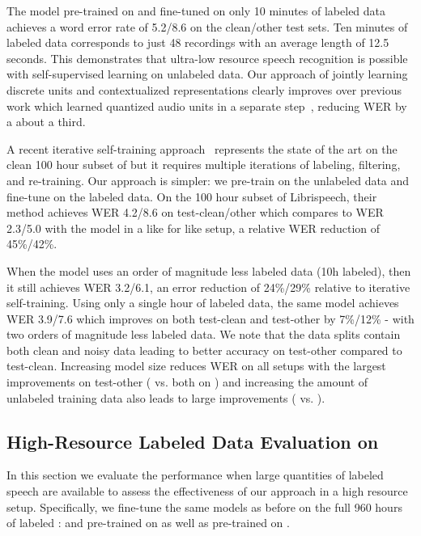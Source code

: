 \documentclass{article}
\begin{document}
The \wvppbig{} model pre-trained on \voxsz{} and fine-tuned on only 10 minutes of labeled data achieves a word error rate of 5.2/8.6 on the \libri{} clean/other test sets.
Ten minutes of labeled data corresponds to just 48 recordings with an average length of 12.5 seconds.
This demonstrates that ultra-low resource speech recognition is possible with self-supervised learning on unlabeled data.
Our approach of jointly learning discrete units and contextualized representations clearly improves over previous work which learned quantized audio units in a separate step~\citep{baevski2019effectiveness}, reducing WER by a about a third.

A recent iterative self-training approach~\citep{park2020improved} represents the state of the art on the clean 100 hour subset of \libri{} but it requires multiple iterations of labeling, filtering, and re-training. 
Our approach is simpler: we pre-train on the unlabeled data and fine-tune on the labeled data.
On the 100 hour subset of Librispeech, their method achieves WER 4.2/8.6 on test-clean/other which compares to WER 2.3/5.0 with the \wvppbig{} model in a like for like setup, a relative WER reduction of 45\%/42\%.

When the \wvppbig{} model uses an order of magnitude less labeled data (10h labeled), then it still achieves WER 3.2/6.1, an error reduction of 24\%/29\% relative to iterative self-training.
Using only a single hour of labeled data, the same model achieves WER 3.9/7.6 which improves on both test-clean and test-other by 7\%/12\% - with two orders of magnitude less labeled data.
We note that the \libril{} data splits contain both clean and noisy data leading to better accuracy on test-other compared to test-clean.
Increasing model size reduces WER on all setups with the largest improvements on test-other (\wvppbase{} vs. \wvppbig{} both on \librisz{}) and increasing the amount of unlabeled training data also leads to large improvements (\wvppbig{} \librisz{} vs. \voxsz{}).





\subsection{High-Resource Labeled Data Evaluation on \libri{}}

In this section we evaluate the performance when large quantities of labeled speech are available to assess the effectiveness of our approach in a high resource setup.
Specifically, we fine-tune the same models as before on the full 960 hours of labeled \libri{}: \wvppbase{} and \wvppbig{} pre-trained on \librisz{} as well as \wvppbig{} pre-trained on \voxsz{}.
\end{document}

